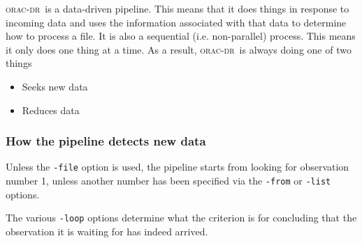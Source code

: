 \documentclass[twoside,11pt]{article}
\renewcommand{\_}{\texttt{\symbol{95}}}
\newcommand{\oracdr}{\textsc{orac-dr}}
\begin{document}
\oracdr\ is a data-driven pipeline. This means that it does things in
response to incoming data and uses the information associated with
that data to determine how to process a file. It is also a sequential
(i.e. non-parallel) process. This means it only does one thing at a
time. As a result, \oracdr\ is always doing one of two things

\begin{itemize}
\item 

Seeks new data

\item 

Reduces data

\end{itemize}
\subsubsection*{How the pipeline detects new data\label{The_ORAC-DR_Data_Loops_How_the_pipeline_detects_new_data}}

Unless the \texttt{-file} option is used, the pipeline starts from looking for observation number 1, unless another number has been specified via the 
\texttt{-from} or \texttt{-list} options.



The various \texttt{-loop} options determine what the criterion is for
concluding that the observation it is waiting for has indeed arrived.
\end{document}
